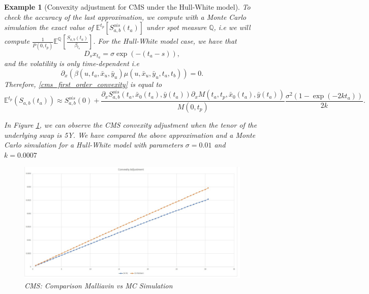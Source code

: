 \documentclass[a4paper,10pt]{article}
\newtheorem{example}[theorem]{Example}
\newcommand{\1}{\mathbf{1}}
\begin{document}
\begin{example}[Convexity adjustment for CMS under the Hull-White model]
To check the accuracy of the last approximation, we compute with a Monte Carlo simulation the exact value of $\mathbb{E}^{t_p}\left[S^{ois}_{a,b}(t_a)\right]$ under spot measure $\mathbb{Q}$, i.e we will compute  $\frac{1}{P(0,t_p)}  \mathbb{E}^{\mathbb{Q}}\left[\frac{S_{a,b}(t_a)}{\beta_{t_a}} \right]$. For the Hull-White model case, we have that
\begin{equation*}
D_s x_{t_a} = \sigma \exp(-(t_a - s)),
\end{equation*}
and the volatility is only time-dependent i.e 
$$
\partial_x (\beta(u,t_a,\bar{x}_u,\bar{y}_u) \mu(u,\bar{x}_u, \bar{y}_u,t_a,t_b)) = 0.
$$
Therefore, \eqref{cms_first_order_convexity} is equal to
\begin{equation*}
\mathbb{E}^{t_p}\left(S_{a,b}(t_a)\right) \approx  S^{ois}_{a,b}(0) + \frac{\partial_x S^{ois}_{a,b}(t_a, \bar{x}_0(t_a),\bar{y}(t_a))\partial_x M(t_a,t_p, \bar{x}_0(t_a),\bar{y}(t_a))}{M(0,t_p)} \frac{\sigma^{2}(1-\exp(-2kt_a))}{2k}.
\end{equation*}

In Figure \ref{fig:CMS}, we can observe the CMS convexity adjustment when the tenor of the underlying swap is 5Y. We have compared the above approximation and a Monte Carlo simulation for a Hull-White model with parameters $\sigma=0.01$ and $k=0.0007$

\begin{figure}[H]
	\begin{center}
		\includegraphics[scale=0.25]{Figures/cms_convexity_order.jpg}
	\end{center}
	\caption{CMS: Comparison Malliavin vs MC Simulation}
	\label{fig:CMS}
\end{figure} 
\end{example}
\end{document}

